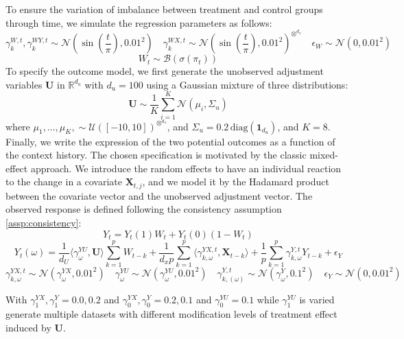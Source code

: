 \documentclass[10pt]{article} %
\begin{document}
To ensure the variation of imbalance between treatment and control groups through time, we simulate the regression parameters as follows: 
\begin{equation*}
\gamma_{k}^{W,t}, \gamma_{k}^{WY,t} \sim \mathcal{N}(\sin(\frac{t}{\pi}),0.01^2 ) \quad \gamma_{k}^{WX,t} \sim \mathcal{N}(\sin(\frac{t}{\pi}),0.01^2)^{\otimes^{d_x}}     \quad\epsilon_W \sim \mathcal{N}(0, 0.01^2) 
\end{equation*}
\begin{equation*}
W_t \sim \mathcal{B}(\sigma(\pi_t))
\end{equation*}
To specify the outcome model, we first generate the unobserved adjustment variables $\mathbf{U}$ in $\mathbb{R}^{d_u}$ with $d_u = 100$ using a Gaussian mixture of three distributions: 
\begin{equation*}
       \mathbf{U} \sim \frac{1}{K}\sum_{i=1}^K \mathcal{N}(\mu_i, \Sigma_u)
\end{equation*}
where $\mu_1, \dots, \mu_K ,\sim \mathcal{U}([-10,10])^{\otimes^{d_u}} $, and $\Sigma_u = 0.2\,\mathrm{diag}(\mathbf{1}_{d_u})$, and \(K=8\).
Finally, we write the expression of the two potential outcomes as a function of the context history. The chosen specification is motivated by the classic mixed-effect approach. We introduce the random effects to have an individual reaction to the change in a covariate $\mathbf{X}_{t,j}$, and we model it by the Hadamard product between the covariate vector and the unobserved adjustment vector. The observed response is defined following the consistency assumption \ref{assp:consistency}:
\begin{equation*}
    Y_t =  Y_t(1) W_t + Y_t(0)(1-W_t)
\end{equation*}
\begin{equation*}
Y_t(\omega) = \frac{1}{d_{U}}\langle  \gamma_{\omega}^{YU}, \mathbf{U}    \rangle  \sum_{k = 1}^{p}W_{t-k} + \frac{1}{d_xp}\sum_{k = 1}^{p}\langle \gamma_{k, \omega}^{YX,t}, \mathbf{X}_{t-k}\rangle + \frac{1}{p}\sum_{k = 1}^{p}\gamma_{k, \omega}^{Y,t}Y_{t-k} +  \epsilon_Y
\end{equation*}
\begin{equation*}
    \gamma_{k, \omega}^{YX,t} \sim \mathcal{N}(\gamma_{\omega}^{YX},0.01^2) \quad \gamma_{\omega}^{YU} \sim \mathcal{N}(\gamma_{\omega}^{YU},0.01^2) \quad \gamma_{k, (\omega)}^{Y,t} \sim \mathcal{N}(\gamma_{\omega}^{Y},0.1^2) \quad \epsilon_Y \sim \mathcal{N}(0,0.01^2)
\end{equation*}

With \(\gamma_{1}^{YX}, \gamma_{1}^{Y} = 0.0, 0.2\) and \(\gamma_{0}^{YX}, \gamma_{0}^{Y} = 0.2, 0.1\) and \(\gamma_{0}^{YU} = 0.1\) while \(\gamma_{1}^{YU}\) is varied generate multiple datasets with different modification levels of treatment effect induced by \(\mathbf{U}\).
\end{document}

